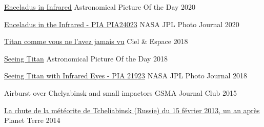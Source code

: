 
\begin{cvhonors}
    \cvhonor
	{\href{https://apod.nasa.gov/apod/ap200924.html}{Enceladus in Infrared}}
	{}
	{Astronomical Picture Of the Day}
	{2020}

	\cvhonor
	{\href{https://www.jpl.nasa.gov/spaceimages/details.php?id=PIA24023}{Enceladus in the Infrared - PIA PIA24023}}
	{}
	{NASA JPL Photo Journal}
	{2020}

	\cvhonor
	{\href{https://www.cieletespace.fr/actualites/titan-comme-vous-ne-l-avez-jamais-vu}{Titan comme vous ne l'avez jamais vu}}
	{}
	{Ciel \& Espace}
	{2018}

    \cvhonor
	{\href{https://apod.nasa.gov/apod/ap180818.html}{Seeing Titan}}
	{}
	{Astronomical Picture Of the Day}
	{2018}

	\cvhonor
	{\href{https://www.jpl.nasa.gov/spaceimages/details.php?id=PIA21923}{Seeing Titan with Infrared Eyes - PIA 21923}}
	{}
	{NASA JPL Photo Journal}
	{2018}

    \cvhonor
	{Airburst over Chelyabinsk and small impactors}
	{}
	{GSMA Journal Club}
	{2015}

	\cvhonor
	{\href{{http://planet-terre.ens-lyon.fr/article/meteorite-Tcheliabinsk.xml}}{La chute de la météorite de Tcheliabinsk (Russie) du 15 février 2013, un an après}}
	{}
	{Planet Terre}
	{2014}

\end{cvhonors}
